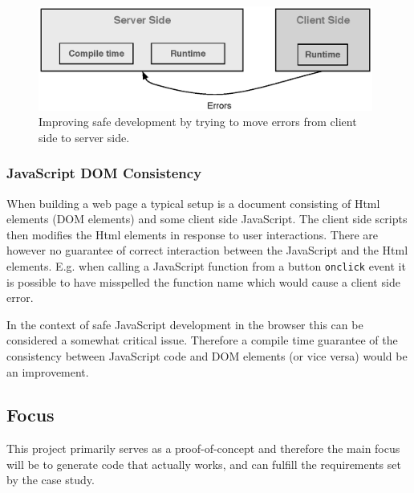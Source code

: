 			\begin{figure}
				\begin{center}
					\centerline{\includegraphics[width=11cm]{resources/images/MovingErrors.eps}}
				\end{center}
				\caption{Improving safe development by trying to move errors from client side to server side.}
				\label{movingErrors}
			\end{figure}

		\subsubsection{JavaScript DOM Consistency} %
		\label{ssub:javascript_dom_consistency}
			When building a web page a typical setup is a document consisting of Html elements (DOM elements) and some client side JavaScript. The client side scripts then modifies the Html elements in response to user interactions. There are however no guarantee of correct interaction between the JavaScript and the Html elements. E.g. when calling a JavaScript function from a button \texttt{onclick} event it is possible to have misspelled the function name which would cause a client side error.

			In the context of safe JavaScript development in the browser this can be considered a somewhat critical issue. Therefore a compile time guarantee of the consistency between JavaScript code and DOM elements (or vice versa) would be an improvement.



	\subsection{Focus} %
	\label{sub:focus}
		This project primarily serves as a proof-of-concept and therefore the main focus will be to generate code that actually works, and can fulfill the requirements set by the case study. 

